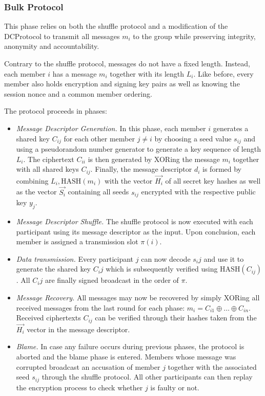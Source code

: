 \subsubsection{Bulk Protocol}

This phase relies on both the shuffle protocol and a modification of the \ac{DCProtocol}
to transmit all messages $m_i$ to the group while preserving integrity, anonymity and accountability.

Contrary to the shuffle protocol, messages do not have a fixed length. Instead, each member
$i$ has a message $m_i$ together with its length $L_i$. Like before, every member also holds encryption and
signing key pairs as well as knowing the session nonce and a common member ordering.

The protocol proceeds in phases:

\begin{itemize}
\item \emph{Message Descriptor Generation.}
      In this phase, each member $i$ generates a shared key $C_{ij}$ for each other member $j \neq i$
      by choosing a seed value $s_{ij}$ and using a pseudorandom number generator \cite{stinson2006cryptography} to generate a
      key sequence of length $L_i$. The ciphertext $C_{ii}$ is then generated by
      XORing the message $m_i$ together with all shared keys $C_{ij}$. Finally, the message descriptor
      $d_i$ is formed by combining $L_i, \text{HASH}(m_i)$ with the vector $\vec{H_i}$ of all secret key
      hashes as well as the vector $\vec{S_i}$ containing all seeds $s_{ij}$ encrypted with the respective
      public key $y_j$.
\item \emph{Message Descriptor Shuffle.}
      The shuffle protocol is now executed with each participant using its message descriptor
      as the input. Upon conclusion, each member is assigned a transmission slot $\pi(i)$.
\item \emph{Data transmission.}
      Every participant $j$ can now decode $s_ij$ and use it to generate the shared key $C_ij$ which
      is subsequently verified using $\text{HASH}(C_{ij})$. All $C_ij$ are finally signed broadcast in the order
      of $\pi$.
\item \emph{Message Recovery.}
      All messages may now be recovered by simply XORing all received messages from the last round for each phase: $m_i = C_{i1} \oplus \ldots \oplus C_{in}$. Received ciphertexts $C_{ij}$ can be verified
      through their hashes taken from the $\vec{H_i}$ vector in the message descriptor.
\item \emph{Blame.}
      In case any failure occurs during previous phases, the protocol is aborted and the blame phase is entered.
      Members whose message was corrupted broadcast an accusation of member $j$ together with the
      associated seed $s_{ij}$ through the shuffle protocol.
      All other participants can then replay the encryption process to check whether $j$
      is faulty or not.
\end{itemize}

